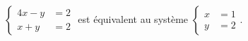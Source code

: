 $\begin{cases}4x-y &= 2 \\ x+y &= 2\end{cases}$ est équivalent au système $\begin{cases}x&=1 \\ y&=2\end{cases}$.

\begin{reponses}
\end{reponses}


